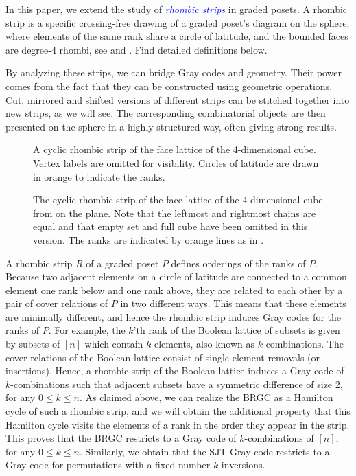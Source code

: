 \documentclass[fontsize=11pt,a4paper,DIV=12]{scrartcl}
\newcommand{\defn}[1]{\textsl{\textcolor{Blue}{#1}}}
\begin{document}
In this paper, we extend the study of \defn{rhombic strips} in graded posets. A rhombic strip is a specific crossing-free drawing of a graded poset's diagram on the sphere, where elements of the same rank share a circle of latitude, and the bounded faces are degree-4 rhombi, see  and . Find detailed definitions below.

By analyzing these strips, we can bridge Gray codes and geometry. Their power comes from the fact that they can be constructed using geometric operations. Cut, mirrored and shifted versions of different strips can be stitched together into new strips, as we will see. The corresponding combinatorial objects are then presented on the sphere in a highly structured way, often giving strong results.

\begin{figure}
    \centering
    
    \caption{A cyclic rhombic strip of the face lattice of the 4-dimensional cube. Vertex labels are omitted for visibility. Circles of latitude are drawn in orange to indicate the ranks.}
    \label{fig:B4 on sphere}
\end{figure}

\begin{figure}
    \centering
    \makebox[\textwidth][c]{
        
    }
    \caption{The cyclic rhombic strip of the face lattice of the 4-dimensional cube from  on the plane. Note that the leftmost and rightmost chains are equal and that empty set and full cube have been omitted in this version. The ranks are indicated by orange lines as in .}
    \label{fig:B4 on plane}
\end{figure}

A rhombic strip $R$ of a graded poset $P$ defines orderings of the ranks of $P$. Because two adjacent elements on a circle of latitude are connected to a common element one rank below and one rank above, they are related to each other by a pair of cover relations of $P$ in two different ways. This means that these elements are minimally different, and hence the rhombic strip induces Gray codes for the ranks of $P$. For example, the $k$'th rank of the Boolean lattice of subsets is given by subsets of $[n]$ which contain $k$ elements, also known as $k$-combinations. The cover relations of the Boolean lattice consist of single element removals (or insertions). Hence, a rhombic strip of the Boolean lattice induces a Gray code of $k$-combinations such that adjacent subsets have a symmetric difference of size 2, for any $0\le k\le n$. As claimed above, we can realize the BRGC as a Hamilton cycle of such a rhombic strip, and we will obtain the additional property that this Hamilton cycle visits the elements of a rank in the order they appear in the strip. This proves that the BRGC restricts to a Gray code of $k$-combinations of $[n]$, for any $0\le k\le n$. Similarly, we obtain that the SJT Gray code restricts to a Gray code for permutations with a fixed number $k$ inversions. 
\end{document}
